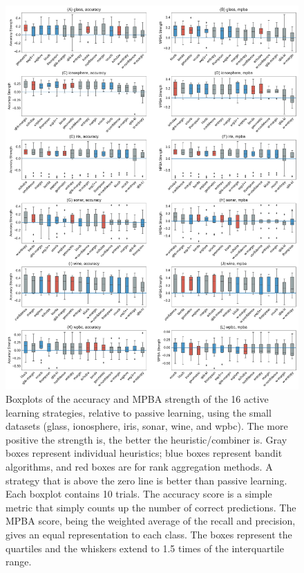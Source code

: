\documentclass[fleqn,10pt,lineno]{wlpeerj} %
\begin{document}
\begin{figure}[tbp]
	\centering
	\includegraphics[width=\textwidth]{Fig6}
	\caption[Policy strength]{Boxplots of the accuracy and MPBA strength of the
	16 active learning strategies, relative to passive learning, using the
	small datasets (glass, ionosphere, iris, sonar, wine, and wpbc). The more
	positive the strength is, the better the heuristic/combiner is. Gray boxes
	represent individual heuristics; blue boxes represent bandit algorithms, and
	red boxes are for rank aggregation methods. A strategy that is above the
	zero line is better than passive learning. Each boxplot contains 10 trials.
	The accuracy score is a simple metric that simply counts up the number of
	correct predictions. The MPBA score, being the weighted average of the
	recall and precision, gives an equal representation to each class. The
	boxes represent the quartiles and the whiskers extend to 1.5 times of the
	interquartile range.}
	\label{fig:strengths-small}
\end{figure}
\end{document}
